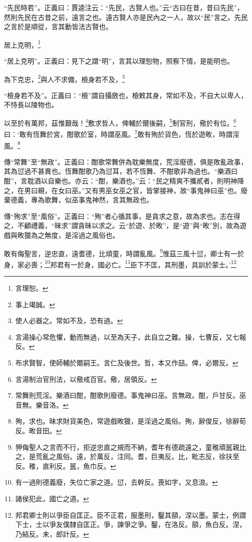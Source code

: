{\noindent\shu{}\fzkt “先民時若”。正義曰：賈逵注云：“先民，古賢人也。”云“古曰在昔，昔曰先民”，然則先民在古昔之前，遠言之也。遠古賢人亦是民內之一人，故以“民”言之。先民之言於是順從，言其動皆法古賢也。 \par}

居上克明，\footnote{言理恕。}

{\noindent\shu{}\fzkt “居上克明”。正義曰：見下之謂“明”，言其以理恕物，照察下情，是能明也。 \par}

為下克忠，\footnote{事上竭誠。}與人不求備，檢身若不及，\footnote{使人必器之。常如不及，恐有過。}

{\noindent\shu{}\fzkt “檢身若不及”。正義曰：“檢”謂自攝斂也，檢敕其身，常如不及，不自大以卑人，不恃長以陵物也。 \par}

以至於有萬邦，茲惟艱哉！\footnote{言湯操心常危懼，動而無過，以至為天子，此自立之難。操，七曹反，又七報反。}敷求哲人，俾輔於爾後嗣，\footnote{布求賢智，使師輔於爾嗣王。言仁及後世。哲，本又作喆。俾，必爾反。}制官刑，儆於有位。\footnote{言湯制治官刑法，以儆戒百官。儆，居領反。}曰：‘敢有恆舞於宮，酣歌於室，時謂巫風。\footnote{常舞則荒淫。樂酒曰酣，酣歌則廢德。事鬼神曰巫。言無政。酣，戶甘反。巫音無。樂音洛。}敢有殉於貨色，恆於遊畋，時謂淫風。\footnote{殉，求也。昧求財貨美色，常遊戲畋獵，是淫過之風俗。殉，辭俊反，徐辭荀反。畋音田。}


{\noindent\zhuan{}\fzbyks 傳“常舞”至“無政”。正義曰：酣歌常舞併為耽樂無度，荒淫廢德，俱是敗亂政事，其為愆過不甚異也。恆舞酣歌乃為愆耳，若不恆舞、不酣歌非為過也。“樂酒曰酣”，言耽酒以自樂也。亦云：“酣，樂酒也。”云：“民之精爽不攜貳者，則明神降之，在男曰覡，在女曰巫。”又有男巫女巫之官，皆掌接神，故“事鬼神曰巫”也。廢棄德義，專為歌舞，似巫事鬼神然，言其無政也。 \par}

{\noindent\zhuan{}\fzbyks 傳“殉求”至“風俗”。正義曰：“殉”者心循其事，是貪求之意，故為求也。志在得之，不顧禮義，“昧求”謂貪昧以求之。云“於遊、於畋”，是“遊”與“畋”別，故為遊戲與畋獵為之無度，是淫過之風俗也。 \par}

敢有侮聖言，逆忠直，遠耆德，比頑童，時謂亂風。\footnote{狎侮聖人之言而不行，拒逆忠直之規而不納，耆年有德疏遠之，童稚頑嚚親比之，是荒亂之風俗。遠，於萬反，注同。耆，巨夷反。比，毗志反，徐扶至反。稚，直利反。嚚，魚巾反。}惟茲三風十愆，卿士有一於身，家必喪；\footnote{有一過則德義廢，失位亡家之道。愆，去幹反。喪如字，又息浪。}邦君有一於身，國必亡。\footnote{諸侯犯此，國亡之道。}臣下不匡，其刑墨，具訓於蒙士。’\footnote{邦君卿士則以爭臣自匡正。臣不正君，服墨刑，鑿其頟，涅以墨。蒙士，例謂下士，士以爭友僕隸自匡正。爭，諫爭之爭。鑿，在洛反。頟，魚白反。涅，乃結反。未，郎計反。}

